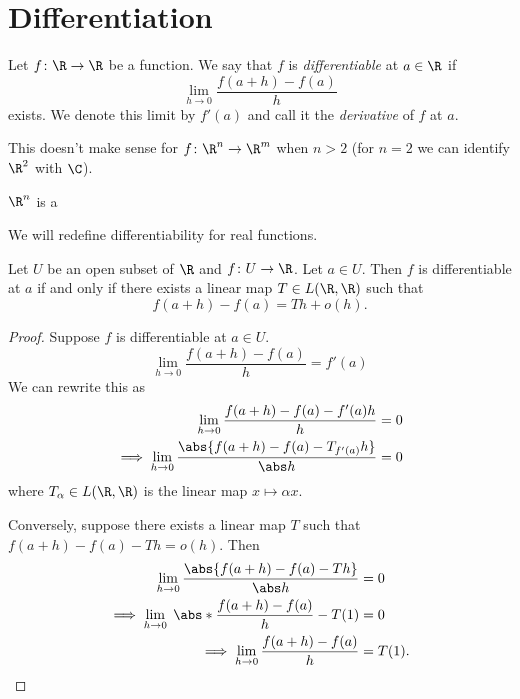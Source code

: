 \chapter{Differentiation} \label{chp:diff}
\begin{definition}
    Let $f\colon \R \to \R$ be a function.
    We say that $f$ is \emph{differentiable} at $a \in \R$ if \[
        \lim_{h \to 0} \frac{f(a + h) - f(a)}{h}
    \] exists.
    We denote this limit by $f'(a)$ and call it the \emph{derivative}
    of $f$ at $a$.
\end{definition}
This doesn't make sense for $f\colon \R^n \to \R^m$ when $n > 2$
(for $n = 2$ we can identify $\R^2$ with $\C$).

\begin{theorem} \label{thm:diff:hurwitz}
    $\R^n$ is a 
\end{theorem}

We will redefine differentiability for real functions.
\begin{proposition*}
    Let $U$ be an open subset of $\R$ and $f\colon U \to \R$.
    Let $a \in U$.
    Then $f$ is differentiable at $a$ if and only if there exists
    a linear map $T \in L(\R, \R)$ such that \[
        f(a + h) - f(a) = Th + o(h).
    \]
\end{proposition*}
\begin{proof}
    Suppose $f$ is differentiable at $a \in U$. \[
        \lim_{h \to 0} \frac{f(a + h) - f(a)}h = f'(a)
    \]
    We can rewrite this as \begin{align*}
        \lim_{h \to 0} \frac{f(a + h) - f(a) - f'(a)h}h &= 0 \\
        \implies \lim_{h \to 0} \frac{\abs{f(a + h) - f(a) - T_{f'(a)}h}}{\abs h} &= 0
    \end{align*} where $T_\alpha \in L(\R, \R)$ is the linear map
    $x \mapsto \alpha x$.

    Conversely, suppose there exists a linear map $T$ such that
    $f(a + h) - f(a) - Th = o(h)$.
    Then \begin{align*}
        \lim_{h \to 0} \frac{\abs{f(a + h) - f(a) - Th}}{\abs h} &= 0 \\
        \implies \lim_{h \to 0}\;\abs*{\frac{f(a+h) - f(a)}h - T(1)} &= 0 \\
        \implies \lim_{h \to 0} \frac{f(a + h) - f(a)}h &= T(1). \qedhere
    \end{align*}
\end{proof}
